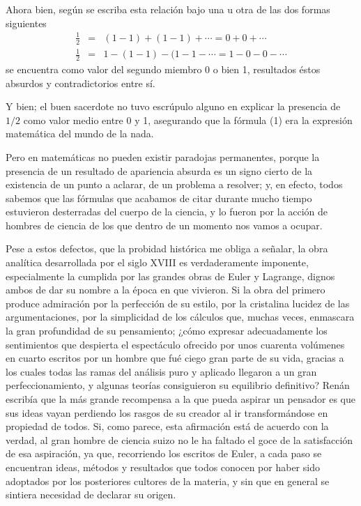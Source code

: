 \documentclass[a4paper, 12pt, draft]{article}
\begin{document}
{Ahora bien, según se escriba esta relación bajo una u otra de las dos formas siguientes
\begin{eqnarray}
\frac{1}{2}& = & (1-1)+(1-1)+ \cdots = 0+0+\cdots \\
\frac{1}{2}& = & 1-(1-1)-(1-1- \cdots = 1-0-0- \cdots
\end{eqnarray}
se encuentra como valor del segundo miembro 0 o bien 1, resultados éstos absurdos y contradictorios entre sí.

Y bien; el buen sacerdote no tuvo escrúpulo alguno en explicar la presencia de $1/2$ como valor medio entre 0 y 1, asegurando que la fórmula (1) era la expresión matemática del mundo de la nada.





Pero en matemáticas no pueden existir paradojas permanentes, porque la presencia de un resultado de apariencia absurda es un signo cierto de la existencia de un punto a aclarar, de un problema a resolver; y, en efecto, todos sabemos que las fórmulas que acabamos de citar durante mucho tiempo estuvieron desterradas del cuerpo de la ciencia, y lo fueron por la acción de hombres de ciencia de los que dentro de un momento nos vamos a ocupar.


Pese a estos defectos, que la probidad histórica me obliga a señalar, la obra analítica desarrollada por el siglo XVIII es verdaderamente imponente, especialmente la cumplida por las grandes obras de Euler y Lagrange, dignos ambos de dar su nombre a la época en que vivieron. Si la obra del primero produce admiración por la perfección de su estilo, por la cristalina lucidez de las argumentaciones, por la simplicidad de los cálculos que, muchas veces, enmascara la gran profundidad de su pensamiento; ¿cómo expresar adecuadamente los sentimientos que despierta el espectáculo ofrecido por unos cuarenta volúmenes en cuarto escritos por un hombre que fué ciego gran parte de su vida, gracias a los cuales todas las ramas del análisis puro y aplicado llegaron a un gran perfeccionamiento, y algunas teorías consiguieron su equilibrio definitivo? Renán escribía que la más grande recompensa a la que pueda
aspirar un pensador es que sus ideas vayan perdiendo los rasgos de su creador al ir transformándose en propiedad de todos. Si, como parece, esta afirmación está de acuerdo con la verdad, al gran hombre de ciencia suizo no le ha faltado el goce de la satisfacción de esa aspiración, ya que, recorriendo los escritos de Euler, a cada paso se encuentran ideas, métodos y resultados que todos conocen por haber sido adoptados por los posteriores cultores de la materia, y sin que en general se sintiera necesidad de declarar su origen.


}
\end{document}
